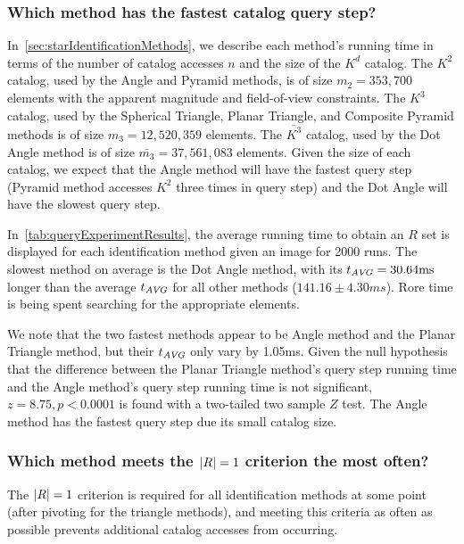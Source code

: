 \subsubsection{Which method has the fastest catalog query step?}
In~\autoref{sec:starIdentificationMethods}, we describe each method's running time in terms of the number of catalog
accesses $n$ and the size of the $K^d$ catalog.
The $K^2$ catalog, used by the Angle and Pyramid methods, is of size $m_2 = 353,700$ elements with the apparent
magnitude and field-of-view constraints.
The $K^3$ catalog, used by the Spherical Triangle, Planar Triangle, and Composite Pyramid methods is of size
$m_3 = 12,520,359$ elements.
The $\bar{K^3}$ catalog, used by the Dot Angle method is of size $\bar{m_3} = 37,561,083$ elements.
Given the size of each catalog, we expect that the Angle method will have the fastest query step
(Pyramid method accesses $K^2$ three times in query step) and the Dot Angle will have the slowest query step.

In~\autoref{tab:queryExperimentResults}, the average running time to obtain an $R$ set is displayed for each
identification method given an image for 2000 runs.
The slowest method on average is the Dot Angle method, with its $t_{\AVG} = 30.64 \si{ms}$ longer than the average
$t_{\AVG}$ for all other methods ($141.16 \pm 4.30 \si{ms}$).
Rore time is being spent searching for the appropriate elements.

We note that the two fastest methods appear to be Angle method and the Planar Triangle method, but their $t_\AVG$ only
vary by 1.05ms.
Given the null hypothesis that the difference between the Planar Triangle method's query step running time and the
Angle method's query step running time is not significant, $z = 8.75, p < 0.0001$ is found with a two-tailed two
sample $Z$ test.
The Angle method has the fastest query step due its small catalog size.

\subsubsection{Which method meets the $\abs{R} = 1$ criterion the most often?}
The $\abs{R} = 1$ criterion is required for all identification methods at some point (after pivoting for the triangle
methods), and meeting this criteria as often as possible prevents additional catalog accesses from occurring.

